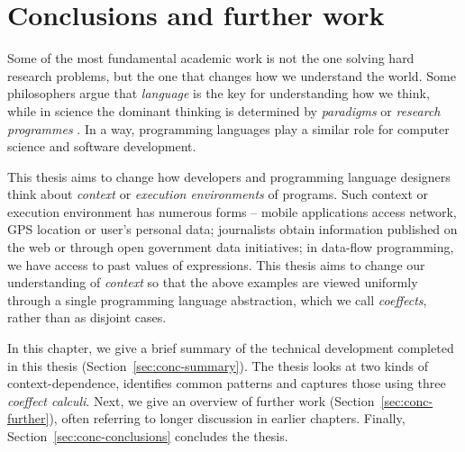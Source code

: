 \chapter{Conclusions and further work} 
\label{ch:conclusions}

Some of the most fundamental academic work is not the one solving hard research problems, but the
one that changes how we understand the world. Some philosophers argue that \emph{language} is the
key for understanding how we think, while in science the dominant thinking is determined by
\emph{paradigms} \cite{philosophy-kuhn} or \emph{research programmes} \cite{philosophy-lakatos}.
In a way, programming languages play a similar role for computer science and software development.

This thesis aims to change how developers and programming language designers think about
\emph{context} or \emph{execution environments} of programs. Such context or execution environment
has numerous forms -- mobile applications access network, GPS location or user's personal data;
journalists obtain information published on the web or through open government data initiatives;
in data-flow programming, we have access to past values of expressions.
This thesis aims to change our understanding of \emph{context} so that the above examples are
viewed uniformly through a single programming language abstraction, which we call \emph{coeffects},
rather than as disjoint cases.

In this chapter, we give a brief summary of the technical development completed in this thesis
(Section~\ref{sec:conc-summary}). The thesis looks at two kinds of context-dependence, identifies
common patterns and captures those using three \emph{coeffect calculi}. Next, we give an overview
of further work (Section~\ref{sec:conc-further}), often referring to longer discussion in earlier
chapters. Finally, Section~\ref{sec:conc-conclusions} concludes the thesis.


%

